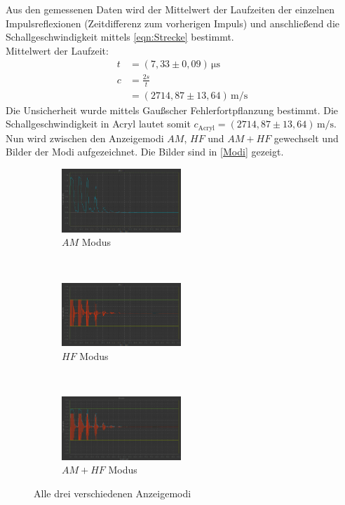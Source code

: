   Aus den gemessenen Daten wird der Mittelwert der Laufzeiten der einzelnen Impulsreflexionen (Zeitdifferenz zum vorherigen Impuls)
  und anschließend die Schallgeschwindigkeit mittels \autoref{eqn:Strecke} bestimmt.\\
  Mittelwert der Laufzeit:
  \begin{align*}
    t &= (7,33 \pm 0,09) \, \si{\micro\second} \\
    c &= \frac{2s}{t} \\
      &= (2714,87 \pm 13,64) \, \si{\meter\per\second}
  \end{align*}
  Die Unsicherheit wurde mittels Gaußscher Fehlerfortpflanzung bestimmt. Die Schallgeschwindigkeit in Acryl lautet somit
  $c_{\mathrm{Acryl}} = (2714,87 \pm 13,64) \, \si{\meter\per\second}$.\\
  Nun wird zwischen den Anzeigemodi $AM$, $HF$ und $AM + HF$ gewechselt und Bilder der Modi aufgezeichnet. Die Bilder sind 
  in \autoref{Modi} gezeigt.
  \begin{figure}
    \centering
    \begin{subfigure}[b]{0.3\textwidth}
      \centering
      \includegraphics[width=4.5cm]{messwerte/Vorbereitung/Amp.png}
      \caption{$AM$ Modus}
    \end{subfigure}
    ~
    \begin{subfigure}[b]{0.3\textwidth}
      \centering
      \includegraphics[width=4.5cm]{messwerte/Vorbereitung/HF.png}
      \caption{$HF$ Modus}
    \end{subfigure}
    ~
    \begin{subfigure}[b]{0.3\textwidth}
      \centering
      \includegraphics[width=4.5cm]{messwerte/Vorbereitung/HF+Amp.png}
      \caption{$AM + HF$ Modus}
    \end{subfigure}
    \caption{Alle drei verschiedenen Anzeigemodi}
    \label{Modi}
  \end{figure}

